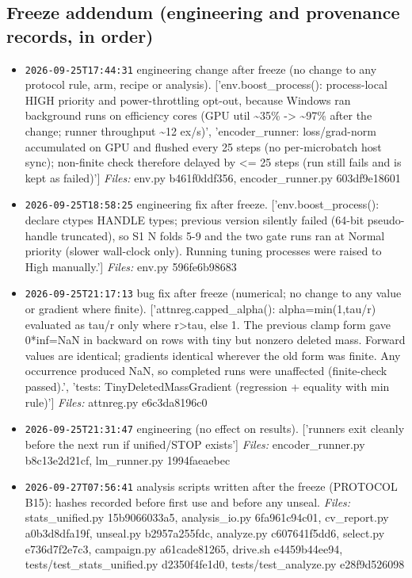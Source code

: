 \documentclass[11pt]{article}
\begin{document}
\subsection{Freeze addendum (engineering and provenance records, in order)}\begin{itemize}
\item \texttt{2026-09-25T17:44:31} engineering change after freeze (no change to any protocol rule, arm, recipe or analysis). ['env.boost\_process(): process-local HIGH priority and power-throttling opt-out, because Windows ran background runs on efficiency cores (GPU util \textasciitilde{}35\% -> \textasciitilde{}97\% after the change; runner throughput \textasciitilde{}12 ex/s)', 'encoder\_runner: loss/grad-norm accumulated on GPU and flushed every 25 steps (no per-microbatch host sync); non-finite check therefore delayed by <= 25 steps (run still fails and is kept as failed)'] \emph{Files:} env.py b461f0ddf356, encoder\_runner.py 603df9e18601
\item \texttt{2026-09-25T18:58:25} engineering fix after freeze. ['env.boost\_process(): declare ctypes HANDLE types; previous version silently failed (64-bit pseudo-handle truncated), so S1 N folds 5-9 and the two gate runs ran at Normal priority (slower wall-clock only). Running tuning processes were raised to High manually.'] \emph{Files:} env.py 596fe6b98683
\item \texttt{2026-09-25T21:17:13} bug fix after freeze (numerical; no change to any value or gradient where finite). ['attnreg.capped\_alpha(): alpha=min(1,tau/r) evaluated as tau/r only where r>tau, else 1. The previous clamp form gave 0*inf=NaN in backward on rows with tiny but nonzero deleted mass. Forward values are identical; gradients identical wherever the old form was finite. Any occurrence produced NaN, so completed runs were unaffected (finite-check passed).', 'tests: TinyDeletedMassGradient (regression + equality with min rule)'] \emph{Files:} attnreg.py e6c3da8196c0
\item \texttt{2026-09-25T21:31:47} engineering (no effect on results). ['runners exit cleanly before the next run if unified/STOP exists'] \emph{Files:} encoder\_runner.py b8c13e2d21cf, lm\_runner.py 1994faeaebec
\item \texttt{2026-09-27T07:56:41} analysis scripts written after the freeze (PROTOCOL B15): hashes recorded before first use and before any unseal.  \emph{Files:} stats\_unified.py 15b9066033a5, analysis\_io.py 6fa961c94c01, cv\_report.py a0b3d8dfa19f, unseal.py b2957a255fdc, analyze.py c607641f5dd6, select.py e736d7f2e7c3, campaign.py a61cade81265, drive.sh e4459b44ee94, tests/test\_stats\_unified.py d2350f4fe1d0, tests/test\_analyze.py e28f9d526098

\end{itemize}
\end{document}
